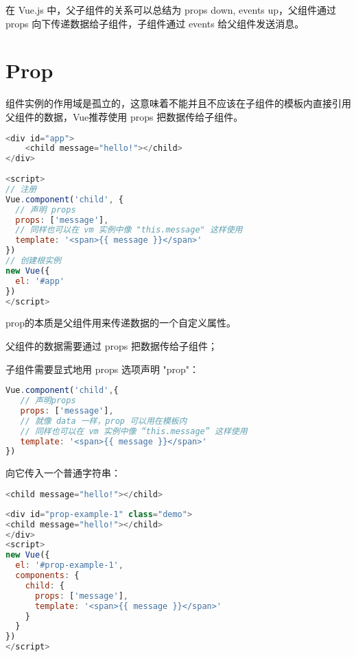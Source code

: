 在 Vue.js 中，父子组件的关系可以总结为 props down, events up，父组件通过 props 向下传递数据给子组件，子组件通过 events 给父组件发送消息。


\section{Prop}



组件实例的作用域是孤立的，这意味着不能并且不应该在子组件的模板内直接引用父组件的数据，Vue推荐使用 props 把数据传给子组件。


\begin{lstlisting}[language=JavaScript]
<div id="app">
    <child message="hello!"></child>
</div>
 
<script>
// 注册
Vue.component('child', {
  // 声明 props
  props: ['message'],
  // 同样也可以在 vm 实例中像 "this.message" 这样使用
  template: '<span>{{ message }}</span>'
})
// 创建根实例
new Vue({
  el: '#app'
})
</script>
\end{lstlisting}


prop的本质是父组件用来传递数据的一个自定义属性。

\begin{compactitem}
\item 父组件的数据需要通过 props 把数据传给子组件；
\item 子组件需要显式地用 props 选项声明 "prop"：
\end{compactitem}


\begin{lstlisting}[language=JavaScript]
Vue.component('child',{
   // 声明props
   props: ['message'],
   // 就像 data 一样，prop 可以用在模板内
   // 同样也可以在 vm 实例中像 “this.message” 这样使用
   template: '<span>{{ message }}</span>'
})
\end{lstlisting}

向它传入一个普通字符串：

\begin{lstlisting}[language=JavaScript]
<child message="hello!"></child>
\end{lstlisting}



\begin{lstlisting}[language=JavaScript]
<div id="prop-example-1" class="demo">
<child message="hello!"></child>
</div>
<script>
new Vue({
  el: '#prop-example-1',
  components: {
    child: {
      props: ['message'],
      template: '<span>{{ message }}</span>'
    }
  }
})
</script>
\end{lstlisting}


